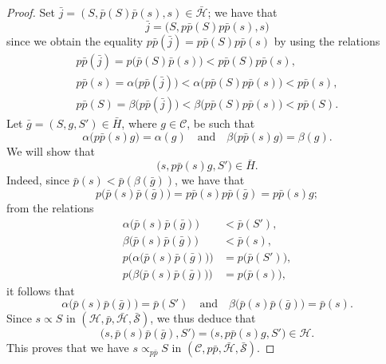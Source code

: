 \documentclass[a4paper,fleqn]{article}
\theoremstyle{plain}
\theoremstyle{definition}
\newcommand{\oldpage}[1]{{\marginpar{\footnotesize$\bigg\vert$\,\,\,\,\textit{p.~#1}}}}
\newcommand{\textand}{\quad\text{and}\quad}
\newcommand{\CC}{\mathcal{C}}
\newcommand{\HH}{\mathcal{H}}
\newcommand{\bHH}{\bar{\HH}}
\renewcommand{\SS}{\mathcal{S}}
\newcommand{\bSS}{\bar{\SS}}
\newcommand{\subs}{\mathrel{\propto}}
\begin{document}
\begin{proof}
  Set $\bar{j}=(S,\bar{p}(S)\bar{p}(s),s)\in\bHH$;
  we have that
  \[
    \bar{j}
    = \big(
      S, p\bar{p}(S)p\bar{p}(s), s
    \big)
  \]
  since we obtain the equality $p\bar{p}(\bar{j})=p\bar{p}(S)p\bar{p}(s)$ by using the relations
  \[
    \begin{gathered}
      p\bar{p}(\bar{j})
      = p\big(
        \bar{p}(S)\bar{p}(s)
      \big)
      < p\bar{p}(S)p\bar{p}(s),
    \\p\bar{p}(s)
      = \alpha\big(
        p\bar{p}(\bar{j})
      \big)
      < \alpha\big(
        p\bar{p}(S)p\bar{p}(s)
      \big)
      < p\bar{p}(s),
    \\p\bar{p}(S)
      = \beta\big(
        p\bar{p}(\bar{j})
      \big)
      < \beta\big(
        p\bar{p}(S)p\bar{p}(s)
      \big)
      < p\bar{p}(S).
    \end{gathered}
  \]
  Let $\bar{g}=(S,g,S')\in\bar{H}$, where $g\in\CC$, be such that
  \[
    \alpha\big(
      p\bar{p}(s)g
    \big) = \alpha(g)
    \textand
    \beta\big(
      p\bar{p}(s)g
    \big) = \beta(g).
  \]
  We will show that
  \[
    \big(
      s, p\bar{p}(s)g, S'
    \big)
    \in\bar{H}.
  \]
  \oldpage{375}
  Indeed, since $\bar{p}(s)<\bar{p}(\beta(\bar{g}))$, we have that
  \[
    p\big(
      \bar{p}(s)\bar{p}(\bar{g})
    \big)
    = p\bar{p}(s)p\bar{p}(\bar{g})
    = p\bar{p}(s)g;
  \]
  from the relations
  \[
    \begin{aligned}
      \alpha\big(
        \bar{p}(s)\bar{p}(\bar{g})
      \big)
      &< \bar{p}(S'),
    \\\beta\big(
        \bar{p}(s)\bar{p}(\bar{g})
      \big)
      &< \bar{p}(s),
    \\p\big(
        \alpha\big(
          \bar{p}(s)\bar{p}(\bar{g})
        \big)
      \big)
      &= p\big(
        \bar{p}(S')
      \big),
    \\p\big(
        \beta\big(
          \bar{p}(s)\bar{p}(\bar{g})
        \big)
      \big)
      &= p\big(
        \bar{p}(s)
      \big),
    \end{aligned}
  \]
  it follows that
  \[
    \alpha\big(
      \bar{p}(s)\bar{p}(\bar{g})
    \big)
    = \bar{p}(S')
    \textand
    \beta\big(
      \bar{p}(s)\bar{p}(\bar{g})
    \big)
    = \bar{p}(s).
  \]
  Since $s\subs S$ in $(\HH,\bar{p},\bHH,\bSS)$, we thus deduce that
  \[
    \big(
      s, \bar{p}(s)\bar{p}(\bar{g}), S'
    \big)
    = \big(
      s, p\bar{p}(s)g, S'
    \big)
    \in\HH.
  \]
  This proves that we have $s\subs_{p\bar{p}}S$ in $(\CC,p\bar{p},\bHH,\bSS)$.
\end{proof}
\end{document}
